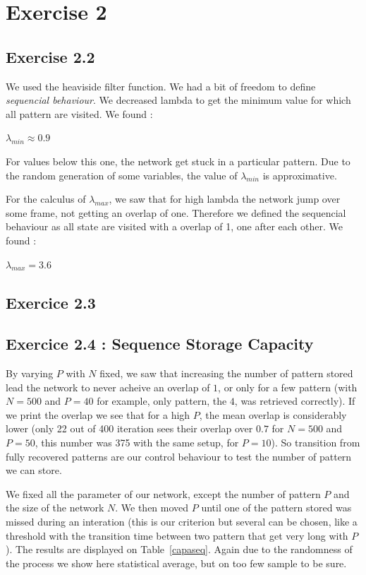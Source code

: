 \section{Exercise 2}
\subsection{Exercise 2.2}
We used the heaviside filter function. We had a bit
of freedom to define {\it sequencial behaviour}. We decreased lambda to get the minimum value
for which all pattern are visited. We found :
\begin{center}
$\lambda_{min} \approx 0.9$
\end{center}
For values below this one, the network get stuck in a particular pattern. Due to the random generation
of some variables, the value of $\lambda_{min}$ is approximative.


For the calculus of $\lambda_{max}$, we saw that for high lambda the network jump over some frame, not
getting an overlap of one. Therefore we defined the sequencial behaviour as all state are visited with a overlap of 1, 
one after each other.
We found :
\begin{center}
$\lambda_{max} = 3.6$
\end{center}
\subsection{Exercice 2.3}

\subsection{Exercice 2.4 : Sequence Storage Capacity}

By varying $P$ with $N$ fixed, we saw that increasing the number of pattern stored lead the network
to never acheive an overlap of $1$, or only for a few pattern (with $N = 500$ and $P = 40$ for example, only pattern, the $4$,
was retrieved correctly). If we print the overlap we see that for a high $P$, the mean overlap is considerably lower (only 22 out of 400
iteration sees their overlap over $0.7$ for $N = 500$ and $P = 50$, this number was 375 with the same setup, for $P = 10$). So transition
from fully recovered patterns are our control behaviour to test the number of pattern we can store. 

We fixed all the parameter of our network, except the number of pattern $P$ and the size of the
network $N$. We then moved $P$ until one of the pattern stored was missed during an interation (this is our criterion
but several can be chosen, like a threshold with the transition time between two pattern that get very long
with $P$). The results are displayed on Table~\ref{capaseq}. Again due to the randomness of the process
we show here statistical average, but on too few sample to be sure. 

